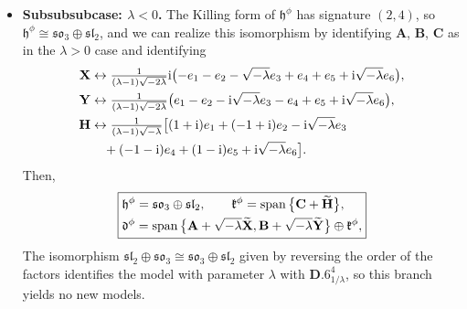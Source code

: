 \documentclass[10pt,a4paper]{amsart}
\newlength{\caseIndent}
\newcommand{\wt} [1]{\smash{\widetilde{#1}}}
\newcommand{\mbA}{\mathbf{A}}
\newcommand{\mbB}{\mathbf{B}}
\newcommand{\mbC}{\mathbf{C}}
\newcommand{\mbH}{\mathbf{H}}
\newcommand{\mbX}{\mathbf{X}}
\newcommand{\mbY}{\mathbf{Y}}
\newcommand{\mfd} {\mathfrak{d}}
\newcommand{\mfh} {\mathfrak{h}}
\newcommand{\mfk} {\mathfrak{k}}
\newcommand{\mfsl} {\mathfrak{sl}}
\newcommand{\mfso} {\mathfrak{so}}
\numberwithin{equation}{section}
\begin{document}
\begin{itemize}[leftmargin=\caseIndent]
\begin{itemize}[leftmargin=\caseIndent]
\begin{itemize}[leftmargin=\caseIndent]
		\item[] \textbf{Subsubsubcase: $\lambda < 0$.} The Killing form of $\mfh^{\phi}$ has signature $(2, 4)$, so $\mfh^{\phi} \cong \mfso_3 \oplus \mfsl_2$, and we can realize this isomorphism by identifying $\mbA$, $\mbB$, $\mbC$ as in the $\lambda > 0$ case and identifying
		\begin{align*}
			\mbX
				&\leftrightarrow \tfrac{1}{(\lambda - 1) \sqrt{- 2 \lambda}} {\rm i} \big({-}e_1 - e_2 - \sqrt{-\lambda} e_3 + e_4 + e_5 + {\rm i} \sqrt{-\lambda} e_6\big) , \\
			\mbY
				&\leftrightarrow \tfrac{1}{(\lambda - 1) \sqrt{- 2 \lambda}} \big(e_1 - e_2 - {\rm i} \sqrt{-\lambda} e_3 - e_4 + e_5 + {\rm i} \sqrt{-\lambda} e_6\big) , \\
			\mbH
				&\leftrightarrow \tfrac{1}{(\lambda - 1) \sqrt{-\lambda}} \big[(1 + {\rm i}) e_1 + (-1 + {\rm i}) e_2 - {\rm i} \sqrt{-\lambda} e_3 \\
 &\quad {}+ (-1 - {\rm i}) e_4 + (1 - {\rm i}) e_5 + {\rm i} \sqrt{-\lambda} e_6\big] .
		\end{align*}
		Then,
		\begin{equation*}
			\boxed{
 \begin{split}
 &\mfh^{\phi} = \mfso_3 \oplus \mfsl_2 , \qquad
	 	 \mfk^{\phi} = \operatorname{span}\big\{\mbC + \wt\mbH\big\} , \\
 &\mfd^{\phi} = \operatorname{span}\big\{
								\mbA + \sqrt{-\lambda} \wt\mbX,
								\mbB + \sqrt{-\lambda} \wt\mbY
							 \big\} \oplus \mfk^{\phi} ,
 \end{split}
			}
		\end{equation*}
		The isomorphism $\mfsl_2 \oplus \mfso_3 \cong \mfso_3 \oplus \mfsl_2$ given by reversing the order of the factors identifies the model with parameter $\lambda$ with $\mathbf{D.6}_{1 / \lambda}^4$, so this branch yields no new models.
		\end{itemize}
	\end{itemize}
\end{itemize}
\end{document}
